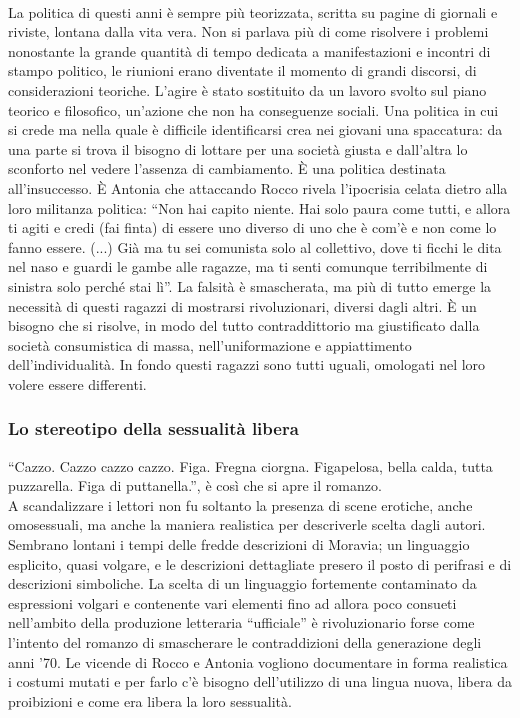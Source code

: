 \paragraph{}La politica di questi anni è sempre più teorizzata, scritta su pagine di giornali e riviste, lontana dalla vita vera.
Non si parlava più di come risolvere i problemi nonostante la grande quantità di tempo dedicata a manifestazioni e incontri di stampo politico, le riunioni erano diventate il momento di grandi discorsi, di considerazioni teoriche.
L'agire è stato sostituito da un lavoro svolto sul piano teorico e filosofico, un'azione che non ha conseguenze sociali.
Una politica in cui si crede ma nella quale è difficile identificarsi crea nei giovani una spaccatura: da una parte si trova il bisogno di lottare per una società giusta e dall'altra lo sconforto nel vedere l'assenza di cambiamento.
È una politica destinata all'insuccesso.
È Antonia che attaccando Rocco rivela l'ipocrisia celata dietro alla loro militanza politica: \enquote{Non hai capito niente. Hai solo paura come tutti, e allora ti agiti e credi (fai finta) di essere uno diverso di uno che è com'è e non come lo fanno essere. (...) Già ma tu sei comunista solo al collettivo, dove ti ficchi le dita nel naso e guardi le gambe alle ragazze, ma ti senti comunque terribilmente di sinistra solo perché stai lì}.
La falsità è smascherata, ma più di tutto emerge la necessità di questi ragazzi di mostrarsi rivoluzionari, diversi dagli altri.
È un bisogno che si risolve, in modo del tutto contraddittorio ma giustificato dalla società consumistica di massa, nell'uniformazione e appiattimento dell'individualità.
In fondo questi ragazzi sono tutti uguali, omologati nel loro volere essere differenti.






\subsubsection{Lo stereotipo della sessualità libera}
\enquote{Cazzo. Cazzo cazzo cazzo. Figa. Fregna ciorgna. Figapelosa, bella calda, tutta puzzarella. Figa di puttanella.}, è così che si apre il romanzo.
\\A scandalizzare i lettori non fu soltanto la presenza di scene erotiche, anche omosessuali, ma anche la maniera realistica per descriverle scelta dagli autori.
Sembrano lontani i tempi delle fredde descrizioni di Moravia; un linguaggio esplicito, quasi volgare, e le descrizioni dettagliate presero il posto di perifrasi e di descrizioni simboliche.
La scelta di un linguaggio fortemente contaminato da espressioni volgari e contenente vari elementi fino ad allora poco consueti nell'ambito della produzione letteraria “ufficiale” è rivoluzionario forse come l'intento del romanzo di smascherare le contraddizioni della generazione degli anni '70.
Le vicende di Rocco e Antonia vogliono documentare in forma realistica i costumi mutati e per farlo c'è bisogno dell'utilizzo di una lingua nuova, libera da proibizioni e come era libera la loro sessualità.

